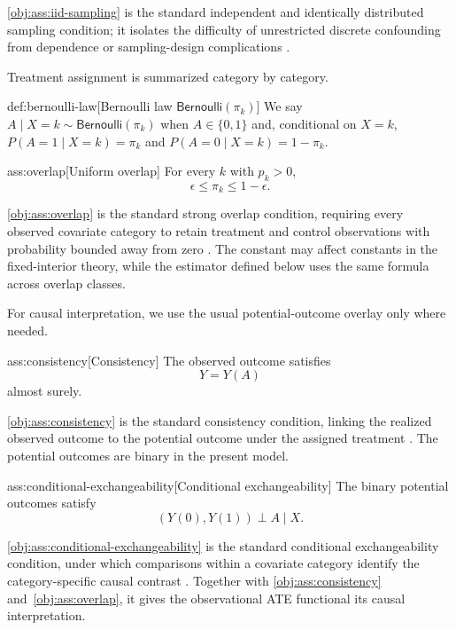 \cref{obj:ass:iid-sampling} is the standard independent and identically distributed sampling condition; it isolates the difficulty of unrestricted discrete confounding from dependence or sampling-design complications \citep{ZengBalakrishnanHanKennedy2024}.

Treatment assignment is summarized category by category.

\begin{definitionv}{def:bernoulli-law}[Bernoulli law \(\mathsf{Bernoulli}(\pi_k)\)]
We say \(A\mid X=k\sim\mathsf{Bernoulli}(\pi_k)\) when \(A\in\{0,1\}\) and, conditional on \(X=k\), \(P(A=1\mid X=k)=\pi_k\) and \(P(A=0\mid X=k)=1-\pi_k\).
\end{definitionv}

\begin{assumptionv}{ass:overlap}[Uniform overlap]
For every \(k\) with \(p_k>0\),
\[
\epsilon\le \pi_k\le 1-\epsilon .
\]
\end{assumptionv}

\cref{obj:ass:overlap} is the standard strong overlap condition, requiring every observed covariate category to retain treatment and control observations with probability bounded away from zero \citep{ZengBalakrishnanHanKennedy2024}. The constant  may affect constants in the fixed-interior theory, while the estimator defined below uses the same formula across overlap classes.

For causal interpretation, we use the usual potential-outcome overlay only where needed.

\begin{assumptionv}{ass:consistency}[Consistency]
The observed outcome satisfies
\[
Y=Y(A)
\]
almost surely.
\end{assumptionv}

\cref{obj:ass:consistency} is the standard consistency condition, linking the realized observed outcome to the potential outcome under the assigned treatment \citep{ZengBalakrishnanHanKennedy2024}. The potential outcomes  are binary in the present model.

\begin{assumptionv}{ass:conditional-exchangeability}[Conditional exchangeability]
The binary potential outcomes satisfy
\[
(Y(0),Y(1))\perp A\mid X .
\]
\end{assumptionv}

\cref{obj:ass:conditional-exchangeability} is the standard conditional exchangeability condition, under which comparisons within a covariate category identify the category-specific causal contrast \citep{ZengBalakrishnanHanKennedy2024}. Together with \cref{obj:ass:consistency} and~\cref{obj:ass:overlap}, it gives the observational ATE functional its causal interpretation.

